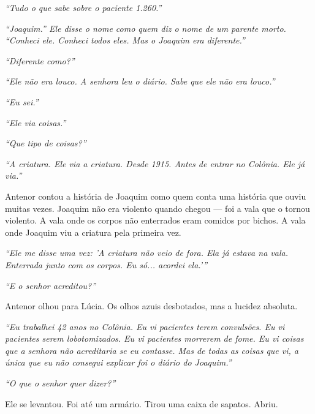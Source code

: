 \noindent \textit{\textquotedblleft{}Tudo o que sabe sobre o paciente 1.260.\textquotedblright{}}

\noindent \textit{\textquotedblleft{}Joaquim.\textquotedblright{}\textit{ Ele disse o nome como quem diz o nome de um parente morto. }\textquotedblleft{}Conheci ele. Conheci todos eles. Mas o Joaquim era diferente.\textquotedblright{}}

\noindent \textit{\textquotedblleft{}Diferente como?\textquotedblright{}}

\noindent \textit{\textquotedblleft{}Ele não era louco. A senhora leu o diário. Sabe que ele não era louco.\textquotedblright{}}

\noindent \textit{\textquotedblleft{}Eu sei.\textquotedblright{}}

\noindent \textit{\textquotedblleft{}Ele via coisas.\textquotedblright{}}

\noindent \textit{\textquotedblleft{}Que tipo de coisas?\textquotedblright{}}

\noindent \textit{\textquotedblleft{}A criatura. Ele via a criatura. Desde 1915. Antes de entrar no Colônia. Ele já via.\textquotedblright{}}

\noindent Antenor contou a história de Joaquim como quem conta uma história que ouviu muitas vezes. Joaquim não era violento quando chegou --- foi a vala que o tornou violento. A vala onde os corpos não enterrados eram comidos por bichos. A vala onde Joaquim viu a criatura pela primeira vez.

\noindent \textit{\textquotedblleft{}Ele me disse uma vez: 'A criatura não veio de fora. Ela já estava na vala. Enterrada junto com os corpos. Eu só... acordei ela.'\textquotedblright{}}

\noindent \textit{\textquotedblleft{}E o senhor acreditou?\textquotedblright{}}

\noindent Antenor olhou para Lúcia. Os olhos azuis desbotados, mas a lucidez absoluta.

\noindent \textit{\textquotedblleft{}Eu trabalhei 42 anos no Colônia. Eu vi pacientes terem convulsões. Eu vi pacientes serem lobotomizados. Eu vi pacientes morrerem de fome. Eu vi coisas que a senhora não acreditaria se eu contasse. Mas de todas as coisas que vi, a única que eu não consegui explicar foi o diário do Joaquim.\textquotedblright{}}

\noindent \textit{\textquotedblleft{}O que o senhor quer dizer?\textquotedblright{}}

\noindent Ele se levantou. Foi até um armário. Tirou uma caixa de sapatos. Abriu.

